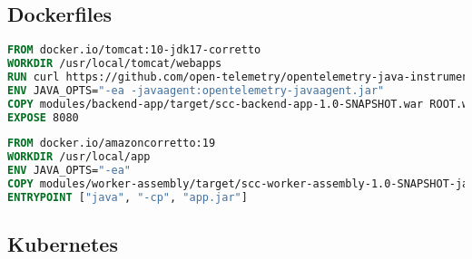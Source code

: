 \documentclass[runningheads]{llncs}
\begin{document}
\subsection{Dockerfiles}
\begin{lstlisting}[language=Dockerfile, caption=backend.dockerfile]
FROM docker.io/tomcat:10-jdk17-corretto
WORKDIR /usr/local/tomcat/webapps
RUN curl https://github.com/open-telemetry/opentelemetry-java-instrumentation/releases/download/v1.20.2/opentelemetry-javaagent.jar -L --output opentelemetry-javaagent.jar
ENV JAVA_OPTS="-ea -javaagent:opentelemetry-javaagent.jar"
COPY modules/backend-app/target/scc-backend-app-1.0-SNAPSHOT.war ROOT.war
EXPOSE 8080
\end{lstlisting}
\begin{lstlisting}[language=Dockerfile, caption=worker.dockerfile]
FROM docker.io/amazoncorretto:19
WORKDIR /usr/local/app
ENV JAVA_OPTS="-ea"
COPY modules/worker-assembly/target/scc-worker-assembly-1.0-SNAPSHOT-jar-with-dependencies.jar app.jar
ENTRYPOINT ["java", "-cp", "app.jar"]
\end{lstlisting}

\subsection{Kubernetes}
\end{document}
